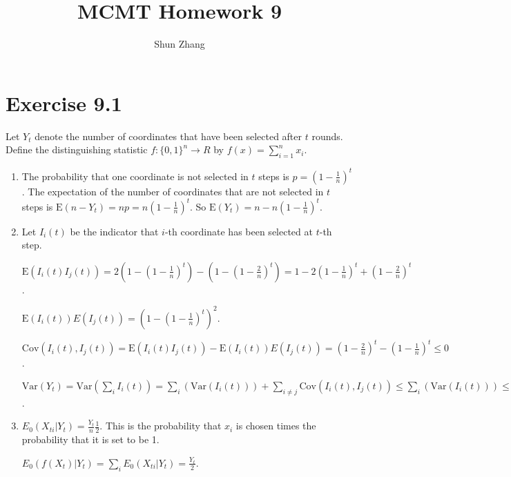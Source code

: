 \documentclass[10pt]{article}
\title{MCMT Homework 9}
\author{Shun Zhang}
\date{}
\newcommand{\Cov}{\mathrm{Cov}}
\newcommand{\E}{\mathrm{E}}
\newcommand{\Var}{\mathrm{Var}}
\begin{document}
\maketitle

\section*{Exercise 9.1}

Let $Y_t$ denote the number of coordinates that have been selected after $t$ rounds.
Define the distinguishing statistic $f:\{0,1\}^n \rightarrow R$ by
$f(x)=\sum_{i=1}^n x_i$.

\begin{enumerate}

\item The probability that one coordinate is not selected in $t$ steps is $p = (1 -
\frac{1}{n})^t$. The expectation of the number of coordinates that are not
selected in $t$ steps is $\E(n - Y_t) = np = n(1 - \frac{1}{n})^t$. So $\E(Y_t) =
n - n(1 - \frac{1}{n})^t$.

\item Let $I_i(t)$ be the indicator that $i$-th coordinate has been selected at
$t$-th step.

$\E(I_i(t) I_j(t)) = 2(1 - (1 - \frac{1}{n})^t) - (1 - (1 - \frac{2}{n})^t) = 1
- 2(1 - \frac{1}{n})^t + (1 - \frac{2}{n})^t$.

$\E(I_i(t))E(I_j(t)) = (1 - (1 - \frac{1}{n})^t)^2$.

$\Cov(I_i(t), I_j(t)) = \E(I_i(t) I_j(t)) - \E(I_i(t))E(I_j(t)) = (1 -
\frac{2}{n})^t - (1 - \frac{1}{n})^t \leq 0$.

$\Var(Y_t) = \Var(\sum_i I_i(t)) = \sum_i(\Var (I_i(t))) + \sum_{i \neq
j}\Cov(I_i(t), I_j(t)) \leq \sum_i(\Var (I_i(t))) \leq n p(1-p) \leq \frac{n}{4}$.

\item $E_0(X_{ti} | Y_t) = \frac{Y_t}{n} \frac{1}{2}$. This is the probability
that $x_i$ is chosen times the probability that it is set to be 1.

$E_0(f(X_t) | Y_t) = \sum_i E_0(X_{ti} | Y_t) = \frac{Y_t}{2}$.

\end{enumerate}
\end{document}
